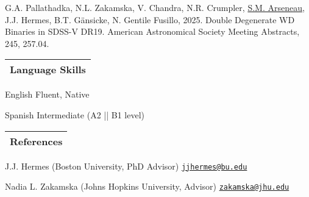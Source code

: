 \documentclass[letterpaper,11pt]{article}
\newenvironment{packed_itemize}{
\begin{itemize}[label=\raisebox{0.25ex}{\tiny$\bullet$}]
  \setlength{\itemsep}{4.2pt}
  \setlength{\parskip}{0pt}
  \setlength{\parsep}{0pt}}{\end{itemize}
}
\newenvironment{packed_enumerate}[1][]{
\begin{etaremune}[#1]
  \setlength{\itemsep}{3.7pt}
  \setlength{\parskip}{0pt}
  \setlength{\parsep}{0pt}}{\end{etaremune}
}
\begin{document}
\noindent

\begin{packed_enumerate}

\item G.A. Pallathadka, N.L. Zakamska, V. Chandra, N.R. Crumpler, \underline{S.M. Arseneau}, J.J. Hermes, B.T. G\"ansicke, N. Gentile Fusillo, 2025. Double Degenerate WD Binaries in SDSS-V DR19. American Astronomical Society Meeting Abstracts, 245, 257.04.

\end{packed_enumerate}
\vspace{2.0mm}


\noindent
\begin{tabular*}{\textwidth}{l@{\extracolsep{\fill}}}
\large {\sc \Large{Language Skills}}\\
\hline
\end{tabular*}\vspace{1.mm}

\begin{packed_itemize}
    \item English \hfill Fluent, Native
    \item Spanish \hfill Intermediate (A2 || B1 level)
\end{packed_itemize}



\noindent
\begin{tabular*}{\textwidth}{l@{\extracolsep{\fill}}}
\large {\sc \Large{References}}\\
\hline
\end{tabular*}\vspace{1.mm}

\begin{packed_itemize}
    \item J.J. Hermes (Boston University, PhD Advisor) \hfill \href{mailto:jjhermes@bu.edu}{\texttt{jjhermes@bu.edu}}
    \item Nadia L. Zakamska (Johns Hopkins University, Advisor) \hfill \href{mailto:zakamska@jhu.edu}{\texttt{zakamska@jhu.edu}}
\end{packed_itemize}


\vspace*{\fill}
\end{document}
